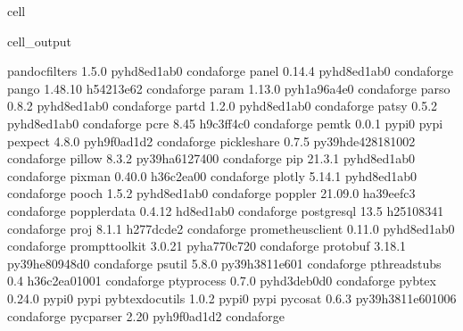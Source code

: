 \documentclass[letterpaper,table,10pt,english]{jupyterBook}
\begin{document}
\begin{sphinxuseclass}{cell}
\begin{sphinxVerbatimOutput}
\begin{sphinxuseclass}{cell_output}
\begin{sphinxVerbatim}[commandchars=\\\{\}]
pandocfilters             1.5.0              pyhd8ed1ab\PYGZus{}0    conda\PYGZhy{}forge
panel                     0.14.4             pyhd8ed1ab\PYGZus{}0    conda\PYGZhy{}forge
pango                     1.48.10              h54213e6\PYGZus{}2    conda\PYGZhy{}forge
param                     1.13.0             pyh1a96a4e\PYGZus{}0    conda\PYGZhy{}forge
parso                     0.8.2              pyhd8ed1ab\PYGZus{}0    conda\PYGZhy{}forge
partd                     1.2.0              pyhd8ed1ab\PYGZus{}0    conda\PYGZhy{}forge
patsy                     0.5.2              pyhd8ed1ab\PYGZus{}0    conda\PYGZhy{}forge
pcre                      8.45                 h9c3ff4c\PYGZus{}0    conda\PYGZhy{}forge
pemtk                     0.0.1                    pypi\PYGZus{}0    pypi
pexpect                   4.8.0              pyh9f0ad1d\PYGZus{}2    conda\PYGZhy{}forge
pickleshare               0.7.5           py39hde42818\PYGZus{}1002    conda\PYGZhy{}forge
pillow                    8.3.2            py39ha612740\PYGZus{}0    conda\PYGZhy{}forge
pip                       21.3.1             pyhd8ed1ab\PYGZus{}0    conda\PYGZhy{}forge
pixman                    0.40.0               h36c2ea0\PYGZus{}0    conda\PYGZhy{}forge
plotly                    5.14.1             pyhd8ed1ab\PYGZus{}0    conda\PYGZhy{}forge
pooch                     1.5.2              pyhd8ed1ab\PYGZus{}0    conda\PYGZhy{}forge
poppler                   21.09.0              ha39eefc\PYGZus{}3    conda\PYGZhy{}forge
poppler\PYGZhy{}data              0.4.12               hd8ed1ab\PYGZus{}0    conda\PYGZhy{}forge
postgresql                13.5                 h2510834\PYGZus{}1    conda\PYGZhy{}forge
proj                      8.1.1                h277dcde\PYGZus{}2    conda\PYGZhy{}forge
prometheus\PYGZus{}client         0.11.0             pyhd8ed1ab\PYGZus{}0    conda\PYGZhy{}forge
prompt\PYGZhy{}toolkit            3.0.21             pyha770c72\PYGZus{}0    conda\PYGZhy{}forge
protobuf                  3.18.1           py39he80948d\PYGZus{}0    conda\PYGZhy{}forge
psutil                    5.8.0            py39h3811e60\PYGZus{}1    conda\PYGZhy{}forge
pthread\PYGZhy{}stubs             0.4               h36c2ea0\PYGZus{}1001    conda\PYGZhy{}forge
ptyprocess                0.7.0              pyhd3deb0d\PYGZus{}0    conda\PYGZhy{}forge
pybtex                    0.24.0                   pypi\PYGZus{}0    pypi
pybtex\PYGZhy{}docutils           1.0.2                    pypi\PYGZus{}0    pypi
pycosat                   0.6.3           py39h3811e60\PYGZus{}1006    conda\PYGZhy{}forge
pycparser                 2.20               pyh9f0ad1d\PYGZus{}2    conda\PYGZhy{}forge

\end{sphinxVerbatim}
\end{sphinxuseclass}
\end{sphinxVerbatimOutput}
\end{sphinxuseclass}
\end{document}
